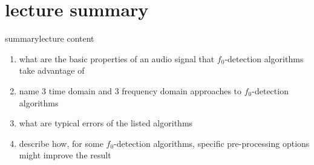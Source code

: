    \section[summary]{lecture summary}
        \begin{frame}{summary}{lecture content}
            \begin{enumerate}
                \item   what are the basic properties of an audio signal that  $f_0$-detection algorithms take advantage of
                \smallskip
                \item<2->   name 3 time domain and 3 frequency domain approaches to $f_0$-detection algorithms
                \smallskip
                \item<3->   what are typical errors of the listed algorithms
                \smallskip
                \item<4->   describe how, for some $f_0$-detection algorithms, specific pre-processing options might improve the result
            \end{enumerate}
        \end{frame}


